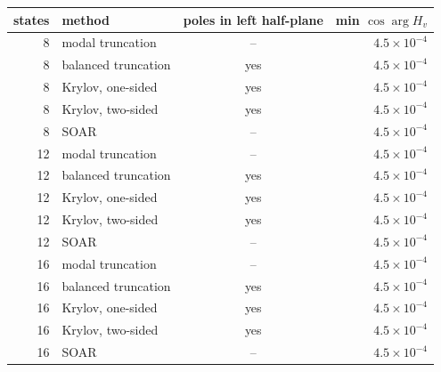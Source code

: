 \begin{tabular}{rlcr}
\toprule
states & method & poles in left half-plane & min $\cos\arg H_v$ \\
\midrule
8 & modal truncation & -- & $4.5\times10^{-4}$ \\
8 & balanced truncation & yes & $4.5\times10^{-4}$ \\
8 & Krylov, one-sided & yes & $4.5\times10^{-4}$ \\
8 & Krylov, two-sided & yes & $4.5\times10^{-4}$ \\
8 & SOAR & -- & $4.5\times10^{-4}$ \\
12 & modal truncation & -- & $4.5\times10^{-4}$ \\
12 & balanced truncation & yes & $4.5\times10^{-4}$ \\
12 & Krylov, one-sided & yes & $4.5\times10^{-4}$ \\
12 & Krylov, two-sided & yes & $4.5\times10^{-4}$ \\
12 & SOAR & -- & $4.5\times10^{-4}$ \\
16 & modal truncation & -- & $4.5\times10^{-4}$ \\
16 & balanced truncation & yes & $4.5\times10^{-4}$ \\
16 & Krylov, one-sided & yes & $4.5\times10^{-4}$ \\
16 & Krylov, two-sided & yes & $4.5\times10^{-4}$ \\
16 & SOAR & -- & $4.5\times10^{-4}$ \\
\bottomrule
\end{tabular}
